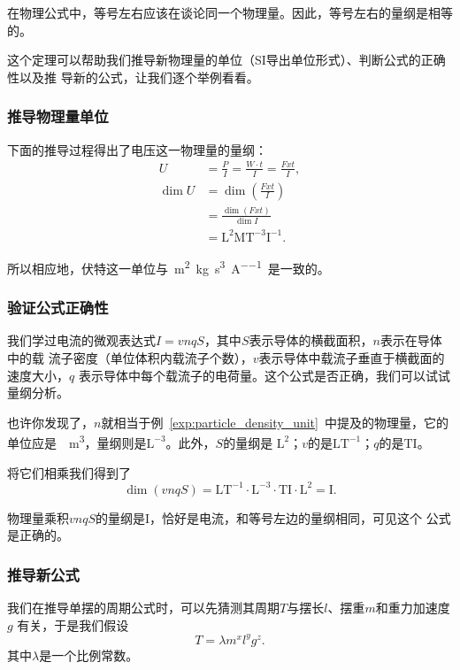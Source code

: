 \begin{rawthm}
    在物理公式中，等号左右应该在谈论同一个物理量。因此，等号左右的量纲是相等的。
\end{rawthm}

这个定理可以帮助我们推导新物理量的单位（SI导出单位形式）、判断公式的正确性以及推
导新的公式，让我们逐个举例看看。

\subsubsection{推导物理量单位}

下面的推导过程得出了电压这一物理量的量纲：
\begin{align*}
    U &= \frac{P}{I} = \frac{W\cdot t}{I} = \frac{Fxt}{I},\\
    \dim U &= \dim \left( \frac{Fxt}{I} \right) \\
                      &= \frac{\dim (Fxt)}{\dim I} \\
                      &= \mathrm{L^2MT^{-3}I^{-1}}
.\end{align*} 

所以相应地，伏特这一单位与~\unit{\square\m\kg\per\cubic\s\per\A}~是一致的。

\subsubsection{验证公式正确性}

我们学过电流的微观表达式$I=vnqS$，其中$S$表示导体的横截面积，$n$表示在导体中的载
流子密度（单位体积内载流子个数），$v$表示导体中载流子垂直于横截面的速度大小，$q$
表示导体中每个载流子的电荷量。这个公式是否正确，我们可以试试量纲分析。

也许你发现了，$n$就相当于例~\ref{exp:particle_density_unit}~中提及的物理量，它的
单位应是~\unit{\per\cubic\meter}，量纲则是$\mathrm{L^{-3}}$。此外，$S$的量纲是
$\mathrm{L^2}$；$v$的是$\mathrm{LT^{-1}}$；$q$的是$\mathrm{TI}$。

将它们相乘我们得到了
\[
    \dim (vnqS) = \mathrm{LT^{-1}\cdot L^{-3}\cdot TI\cdot L^2 = I }
.\] 

物理量乘积$vnqS$的量纲是$\mathrm{I}$，恰好是电流，和等号左边的量纲相同，可见这个
公式是正确的。

\subsubsection{推导新公式}

我们在推导单摆的周期公式时，可以先猜测其周期$T$与摆长$l$、摆重$m$和重力加速度$g$
有关，于是我们假设
\[
    T = \lambda m^{x}l^{y}g^{z}   
.\]
其中$\lambda $是一个比例常数。

